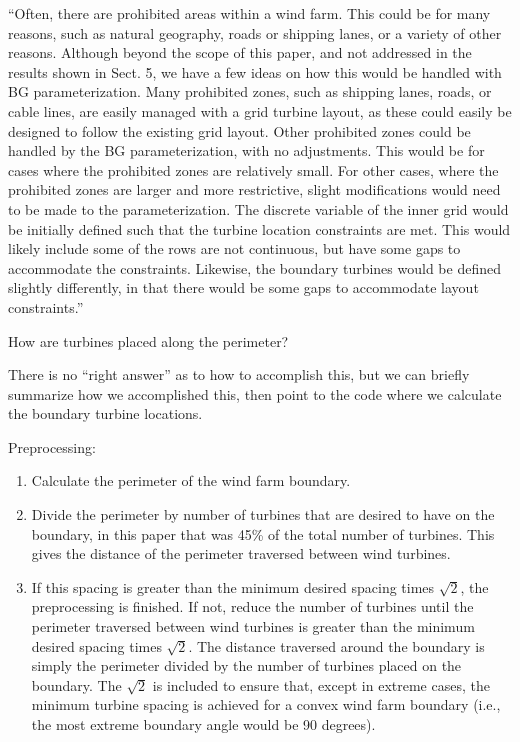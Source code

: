 \documentclass[12pt]{report}
\begin{document}
\smallskip
``Often, there are prohibited areas within a wind farm. This could be for many reasons, such as natural geography, roads or shipping lanes, or a variety of other reasons. Although beyond the scope of this paper, and not addressed in the results shown in Sect. 5, we have a few ideas on how this would be handled with BG parameterization. 
Many prohibited zones, such as shipping lanes, roads, or cable lines, are easily managed with a grid turbine layout, as these could easily be designed to follow the existing grid layout. Other prohibited zones could be handled by the BG parameterization, with no adjustments. This would be for cases where the prohibited zones are relatively small. For other cases, where the prohibited zones are larger and more restrictive, slight modifications would need to be made to the parameterization. The discrete variable of the inner grid would be initially defined such that the turbine location constraints are met. This would likely include some of the rows are not continuous, but have some gaps to accommodate the constraints. Likewise, the boundary turbines would be defined slightly differently, in that there would be some gaps to accommodate layout constraints.''
\color{black}
\bigskip

How are turbines placed along the perimeter? 

\bigskip
\color{blue}

There is no ``right answer'' as to how to accomplish this, but we can briefly summarize how we accomplished this, then point to the code where we calculate the boundary turbine locations.

Preprocessing:

\begin{enumerate}

\item Calculate the perimeter of the wind farm boundary.
\item Divide the perimeter by number of turbines that are desired to have on the boundary, in this paper that was 45\% of the total number of turbines. This gives the distance of the perimeter traversed between wind turbines.
\item If this spacing is greater than the minimum desired spacing times $\sqrt{2}$, the preprocessing is finished. If not, reduce the number of turbines until the perimeter traversed between wind turbines is greater than the minimum desired spacing times $\sqrt{2}$. The distance traversed around the boundary is simply the perimeter divided by the number of turbines placed on the boundary. The $\sqrt{2}$ is included to ensure that, except in extreme cases, the minimum turbine spacing is achieved for a convex wind farm boundary (i.e., the most extreme boundary angle would be 90 degrees). 

\end{enumerate}
\end{document}
